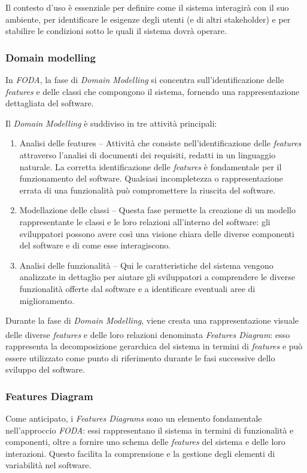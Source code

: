\documentclass[12pt]{report}
\newcommand{\myref}[1]{\textsuperscript{\hyperref[#1]{\ding{70}}}}
\newcommand{\foda}{\textsl{FODA}\xspace}
\begin{document}
Il contesto d'uso è essenziale per definire come il sistema interagirà con il suo ambiente, per identificare le esigenze degli utenti (e di altri stakeholder) e per stabilire le condizioni sotto le quali il sistema dovrà operare.


\subsubsection{Domain modelling}
In \foda, la fase di \textit{Domain Modelling} si concentra sull'identificazione delle \textit{features} e delle classi che compongono il sistema, fornendo una rappresentazione dettagliata del software.

Il \textit{Domain Modelling} è suddiviso in tre attività principali:

\begin{enumerate}
\item \textsf{Analisi delle features} -- Attività che consiste nell'identificazione delle \textit{features} attraverso l'analisi di documenti dei requisiti, redatti in un linguaggio naturale. La corretta identificazione delle \textit{features} è fondamentale per il funzionamento del software. Qualsiasi incompletezza o rappresentazione errata di una funzionalità può compromettere la riuscita del software.
\item \textsf{Modellazione delle classi} -- Questa fase permette la creazione di un modello rappresentante le classi e le loro relazioni all'interno del software: gli sviluppatori possono avere così una visione chiara delle diverse componenti del software e di come esse interagiscono.
\item \textsf{Analisi delle funzionalità} -- Qui le caratteristiche del sistema vengono analizzate in dettaglio per aiutare gli sviluppatori a comprendere le diverse funzionalità offerte dal software e a identificare eventuali aree di miglioramento.
\end{enumerate}

Durante la fase di \textit{Domain Modelling}, viene creata una rappresentazione visuale delle diverse \textit{features} e delle loro relazioni denominata \textit{Features Diagram}\myref{sec:features_diagram}: esso rappresenta la decomposizione gerarchica del sistema in termini di \textit{features} e può essere utilizzato come punto di riferimento durante le fasi successive dello sviluppo del software.


\subsubsection{Features Diagram}
\label{sec:features_diagram}
Come anticipato, i \textit{Features Diagrams} sono un elemento fondamentale nell'approccio \foda: essi rappresentano il sistema in termini di funzionalità e componenti, oltre a fornire uno schema delle \textit{features} del sistema e delle loro interazioni. Questo facilita la comprensione e la gestione degli elementi di variabilità nel software.
\end{document}
